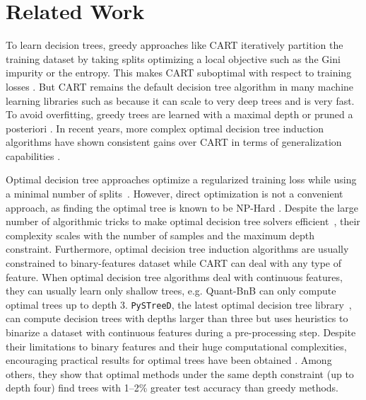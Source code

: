 \section{Related Work}

To learn decision trees, greedy approaches like CART \cite{breiman1984classification} iteratively partition the training dataset by taking splits optimizing a local objective such as the Gini impurity or the entropy. 
This makes CART suboptimal with respect to training losses \cite{Murthy}. 
But CART remains the default decision tree algorithm in many machine learning libraries such as \cite{scikit-learn,xgb,ke2017lightgbm,9533597} because it can scale to very deep trees and is very fast.
To avoid overfitting, greedy trees are learned with a maximal depth or pruned a posteriori \cite[chapter~3]{breiman1984classification}. 
In recent years, more complex optimal decision tree induction algorithms have shown consistent gains over CART in terms of generalization capabilities \cite{oct,verwer2017learning,murtree}.

Optimal decision tree approaches optimize a regularized training loss while using a minimal number of splits~\cite{oct,mfoct,binoct,quantbnb,murtree,blossom,pystreed,chaouki2024branchesfastdynamicprogramming}.
However, direct optimization is not a convenient approach, as finding the optimal tree is known to be NP-Hard \cite{npcomplete}. Despite the large number of algorithmic tricks to make optimal decision tree solvers efficient~\cite{murtree,quantbnb}, their complexity scales with the number of samples and the maximum depth constraint.
Furthermore, optimal decision tree induction algorithms are usually constrained to binary-features dataset while CART can deal with any type of feature. When optimal decision tree algorithms deal with continuous features, they can usually learn only shallow trees, e.g. Quant-BnB \cite{quantbnb} can only compute optimal trees up to depth 3.
\texttt{PySTreeD}, the latest optimal decision tree library~\cite{pystreed}, can compute decision trees with depths larger than three but uses heuristics to binarize a dataset with continuous features during a pre-processing step. %
Despite their limitations to binary features and their huge computational complexities, encouraging practical results for optimal trees have been obtained \cite{how-eff,lin2020generalized,costa2023recent,vanderlinden2024optimalgreedydecisiontrees}.
Among others, they show that optimal methods under the same depth constraint (up to depth four) find
trees with 1--2\% greater test accuracy than greedy methods.


